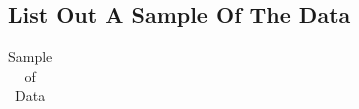 \documentclass[
  letterpaper,
  DIV=11,
  numbers=noendperiod]{scrreprt}
\begin{document}
\subsection{List Out A Sample Of The
Data}\label{list-out-a-sample-of-the-data}

\begin{longtable}[]{@{}
  >{\centering\arraybackslash}p{}
  >{\centering\arraybackslash}p{}
  >{\centering\arraybackslash}p{}
  >{\centering\arraybackslash}p{}
  >{\centering\arraybackslash}p{}
  >{\centering\arraybackslash}p{}@{}}

\caption{\label{tbl-head}Sample of Data}

\tabularnewline


\end{longtable}
\end{document}

